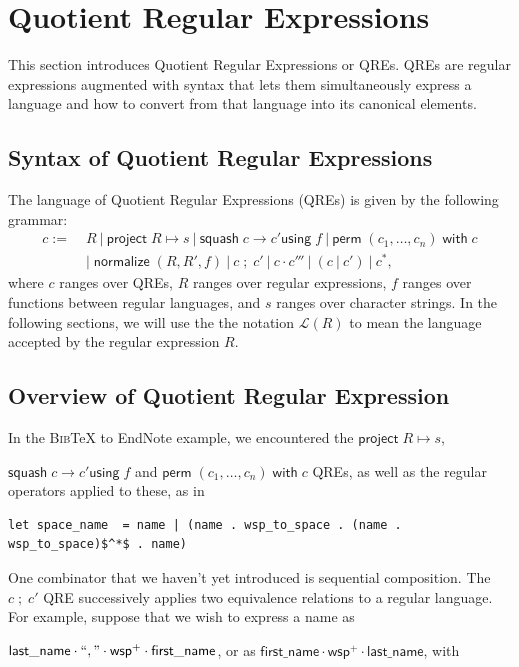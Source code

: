 \documentclass[acmsmall,review,anonymous]{acmart}\settopmatter{printfolios=true,printccs=false,printacmref=false}
\newcommand{\kw}[1]{\ensuremath{\mathsf{#1}}}
\newcommand{\project}[2]{\ensuremath{\kw{project} \; #1 \mapsto #2}}
\newcommand{\squash}[3]{\ensuremath{\kw{squash} \; #1 \rightarrow #2
\kw{using} \; #3}}
\newcommand{\perm}[2]{\ensuremath{\kw{perm}\; (#1)\; \kw{with}\; #2}}
\newcommand{\normalize}[3]{\ensuremath{\kw{normalize} \; (#1, #2, #3)}}
\newcommand{\sep}{\ensuremath{\ | \ }}
\newcommand{\bibtex}{\textsc{Bib}\TeX{}}
\newcommand{\semicolon}{\ensuremath{\; ; \;}}
\begin{document}
\section{Quotient Regular Expressions}
\label{QRE}

This section introduces Quotient Regular Expressions or QREs. QREs are regular
expressions augmented with syntax that lets them simultaneously express a
language and how to convert from that language into its canonical elements.

\subsection{Syntax of Quotient Regular Expressions}
The language of Quotient Regular Expressions (QREs) is given by the following
grammar:
\begin{align*}
c := \; &R \sep \project{R}{s} \sep \squash{c}{c'}{f} \sep
\perm{c_1, \ldots, c_n}{c} \\
& | \; \normalize{R}{R'}{f} \sep c \semicolon c' \sep c \cdot c''' \sep (c \sep
c') \sep c^*,
\end{align*}
where $c$ ranges over QREs, $R$ ranges over regular expressions, $f$ ranges over
functions between regular languages, and $s$ ranges over character strings. In
the following sections, we will use the the notation $\mathcal{L}(R)$ to mean
the language accepted by the regular expression $R$.

\subsection{Overview of Quotient Regular Expression}
In the \bibtex{} to EndNote example, we encountered the $\project{R}{s}$,

\noindent $\squash{c}{c'}{f}$ and $\perm{c_1, \ldots, c_n}{c}$ QREs, as well as
the regular operators applied to these, as in

\begin{lstlisting}
let space_name  = name | (name . wsp_to_space . (name . wsp_to_space)$^*$ . name)
\end{lstlisting}

One combinator that we haven't yet introduced is sequential composition.
The $c \semicolon c'$ QRE successively applies
two equivalence relations to a regular language. For example, suppose that
we wish to express a name as

\noindent $\kw{last\_name \cdot ``,\text{''} \cdot wsp^+ \cdot first\_name}$,
or as $\kw{first\_name\cdot wsp^+ \cdot last\_name}$, with
\end{document}
